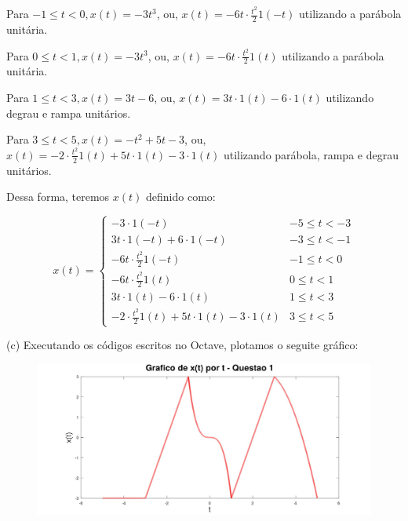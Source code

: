 \documentclass{article}
\begin{document}
\vspace{\baselineskip}

Para $ -1 \leq t < 0, x(t) = -3t^3 $, ou, $ x(t) = -6t \cdot \frac{t^2}{2}1(-t) $ utilizando a parábola unitária.

\vspace{\baselineskip}

Para $ 0 \leq t < 1, x(t) = -3t^3 $, ou, $ x(t) = -6t \cdot \frac{t^2}{2}1(t) $ utilizando a parábola unitária.

\vspace{\baselineskip}

Para $ 1 \leq t < 3, x(t) = 3t - 6 $, ou, $ x(t) = 3t \cdot 1(t) - 6 \cdot 1(t) $ utilizando degrau e rampa unitários.

\vspace{\baselineskip}

Para $ 3 \leq t < 5, x(t) = -t^2 + 5t - 3 $, ou, $ x(t) = -2 \cdot \frac{t^2}{2}1(t) + 5t \cdot 1(t) - 3 \cdot 1(t)$ utilizando parábola, rampa e degrau unitários.

\vspace{\baselineskip}

Dessa forma, teremos $x(t)$ definido como:

\[ x(t) = 
\begin{cases} 
    -3 \cdot 1(-t) & -5 \leq t < -3 \\

    3t \cdot 1(-t) + 6 \cdot 1(-t) & -3 \leq t < -1 \\

    -6t \cdot \frac{t^2}{2}1(-t) & -1 \leq t < 0 \\

    -6t \cdot \frac{t^2}{2}1(t) & 0 \leq t < 1 \\

    3t \cdot 1(t) - 6 \cdot 1(t) & 1 \leq t < 3 \\

    -2 \cdot \frac{t^2}{2}1(t) + 5t \cdot 1(t) - 3 \cdot 1(t) & 3 \leq t < 5 
 \end{cases}
\]


\vspace{\baselineskip}

(c) Executando os códigos escritos no Octave, plotamos o seguite gráfico:

\begin{figure}[h]
    \includegraphics[scale=0.23]{plot1c}
    \centering
\end{figure}
\end{document}
